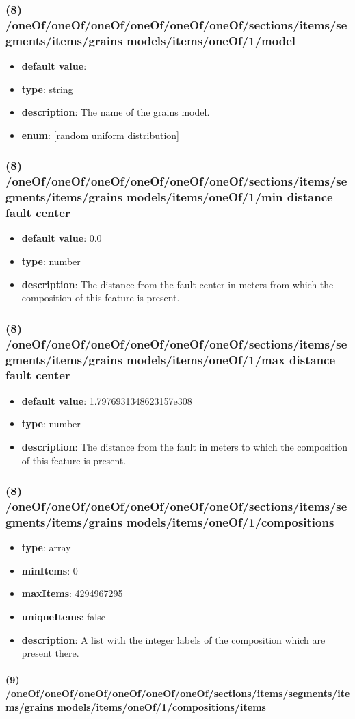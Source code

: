 \subsubsection{(8) /oneOf/oneOf/oneOf/oneOf/oneOf/oneOf/sections/items/segments/items/grains models/items/oneOf/1/model}
\begin{itemize}[leftmargin=8em]\item {\bf default value}: 
\item {\bf type}: string
\item {\bf description}: The name of the grains model.
\item {\bf enum}: [random uniform distribution]\end{itemize}\subsubsection{(8) /oneOf/oneOf/oneOf/oneOf/oneOf/oneOf/sections/items/segments/items/grains models/items/oneOf/1/min distance fault center}
\begin{itemize}[leftmargin=8em]\item {\bf default value}: 0.0
\item {\bf type}: number
\item {\bf description}: The distance from the fault center in meters from which the composition of this feature is present.
\end{itemize}\subsubsection{(8) /oneOf/oneOf/oneOf/oneOf/oneOf/oneOf/sections/items/segments/items/grains models/items/oneOf/1/max distance fault center}
\begin{itemize}[leftmargin=8em]\item {\bf default value}: 1.7976931348623157e308
\item {\bf type}: number
\item {\bf description}: The distance from the fault in meters to which the composition of this feature is present.
\end{itemize}\subsubsection{(8) /oneOf/oneOf/oneOf/oneOf/oneOf/oneOf/sections/items/segments/items/grains models/items/oneOf/1/compositions}
\begin{itemize}[leftmargin=8em]\item {\bf type}: array
\item {\bf minItems}: 0
\item {\bf maxItems}: 4294967295
\item {\bf uniqueItems}: false
\item {\bf description}: A list with the integer labels of the composition which are present there.
\end{itemize}\paragraph{(9) /oneOf/oneOf/oneOf/oneOf/oneOf/oneOf/sections/items/segments/items/grains models/items/oneOf/1/compositions/items}
